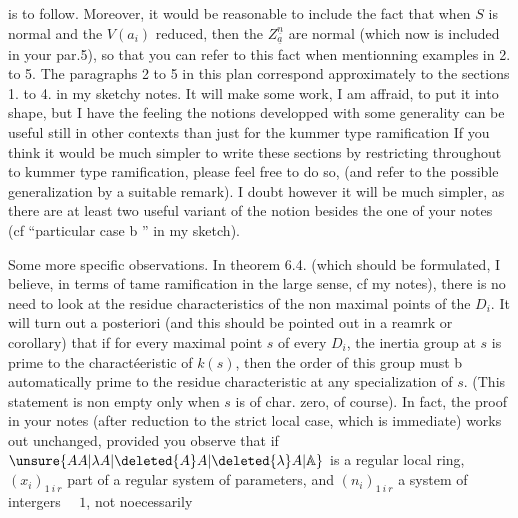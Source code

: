 is to follow. Moreover, it would be reasonable to include the fact that when $S$ is normal and the $V(a_i)$ reduced, then the $Z^{\underline{n}}_{\underline{a}}$ are normal (which now is included in your par.5), so that you can refer to this fact when mentionning examples in  2. to 5. The paragraphs 2 to 5 in this plan correspond approximately to the sections 1. to 4. in my sketchy notes. It will make some work, I am affraid, to put it into shape, but I have the feeling the notions developped with some generality can be useful still in other contexts than just for the kummer type ramification %
If you think it would be much simpler to write these sections by restricting throughout to kummer type ramification, please feel free to do so, (and refer to the possible generalization by a suitable remark). I doubt however it will be much simpler, as there are at least two useful variant %
of the notion besides the one of your notes (cf ``particular case b '' in my sketch).

Some more specific observations. In theorem 6.4. (which should be formulated, I believe, in terms of tame ramification in the large sense, cf my notes), there is no need to look at the residue characteristics of the non maximal points of the $D_i$. It will turn out a posteriori (and this should be pointed out in a reamrk or corollary) that  if for every maximal point $s$ of every $D_i$, the inertia group at $s$ is prime to the charactéeristic of $k(s)$, then the order of this group must b automatically prime to the residue characteristic at any specialization of $s$. (This statement is non empty only when $s$ is of char. zero, of course). In fact, the proof in your notes (after reduction to the strict local case, which is immediate) works out unchanged, provided you observe that if $\unsure{AA|\lambda A|\deleted{A}A|\deleted{\lambda}A|\mathbb{A}}$ is a regular local ring, $(x_i)_{1\ i\ r}$ part of a regular system of parameters, and $(n_i)_{1\ i\ r}$ a system of intergers $\quad1$, not noecessarily
